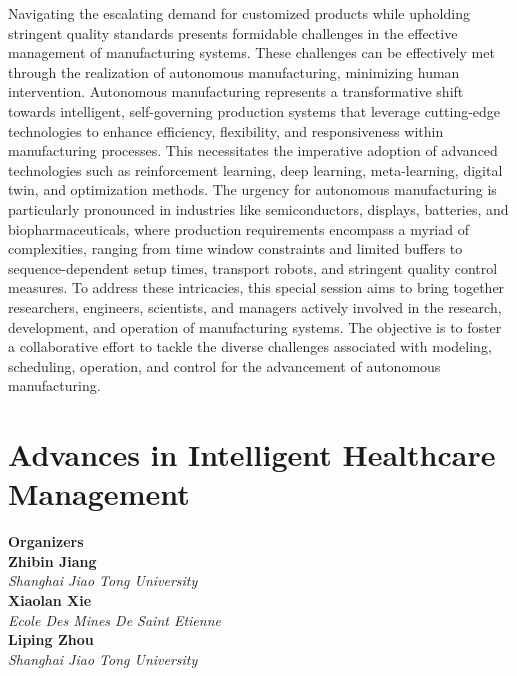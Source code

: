 Navigating the escalating demand for customized products while upholding stringent quality standards presents formidable challenges in the effective management of manufacturing systems. These challenges can be effectively met through the realization of autonomous manufacturing, minimizing human intervention. Autonomous manufacturing represents a transformative shift towards intelligent, self-governing production systems that leverage cutting-edge technologies to enhance efficiency, flexibility, and responsiveness within manufacturing processes. This necessitates the imperative adoption of advanced technologies such as reinforcement learning, deep learning, meta-learning, digital twin, and optimization methods. The urgency for autonomous manufacturing is particularly pronounced in industries like semiconductors, displays, batteries, and biopharmaceuticals, where production requirements encompass a myriad of complexities, ranging from time window constraints and limited buffers to sequence-dependent setup times, transport robots, and stringent quality control measures. To address these intricacies, this special session aims to bring together researchers, engineers, scientists, and managers actively involved in the research, development, and operation of manufacturing systems. The objective is to foster a collaborative effort to tackle the diverse challenges associated with modeling, scheduling, operation, and control for the advancement of autonomous manufacturing. 

\section{Advances in Intelligent Healthcare Management}


\large \textbf{Organizers} \normalsize \vspace{2mm} \\
\textbf{Zhibin  Jiang} \\ 
\textit{Shanghai Jiao Tong University} \vspace{{2mm}} \\
\textbf{Xiaolan  Xie} \\ 
\textit{Ecole Des Mines De Saint Etienne} \vspace{{2mm}} \\
\textbf{Liping  Zhou} \\ 
\textit{Shanghai Jiao Tong University}

